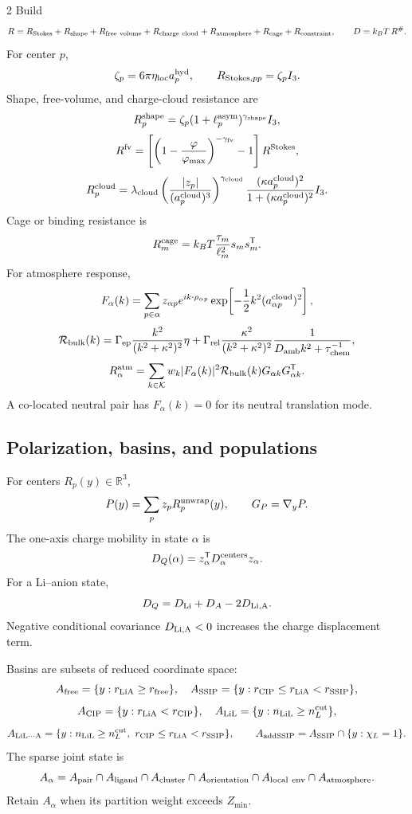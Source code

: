 \documentclass[10pt]{article}
\newcommand{\R}{\mathbb{R}}
\newcommand{\T}{\mathsf{T}}
\begin{document}
\begin{multicols}{2}
Build
\[
R=
R_{\rm Stokes}+R_{\rm shape}+R_{\rm free\ volume}
+R_{\rm charge\ cloud}+R_{\rm atmosphere}
+R_{\rm cage}+R_{\rm constraint},
\qquad
D=k_BT\,R^\#.
\]
For center \(p\),
\[
\zeta_p=6\pi\eta_{\rm loc}a_p^{\rm hyd},
\qquad
R_{{\rm Stokes},pp}=\zeta_p I_3.
\]
Shape, free-volume, and charge-cloud resistance are
\[
R_p^{\rm shape}
=
\zeta_p(1+\ell_p^{\rm asym})^{\gamma_{\rm shape}}I_3,
\]
\[
R^{\rm fv}
=
\left[
\left(1-\frac{\varphi}{\varphi_{\max}}\right)^{-\gamma_{\rm fv}}
-1
\right]R^{\rm Stokes},
\]
\[
R_p^{\rm cloud}
=
\lambda_{\rm cloud}
\left(\frac{|z_p|}{(a_p^{\rm cloud})^3}\right)^{\gamma_{\rm cloud}}
\frac{(\kappa a_p^{\rm cloud})^2}
{1+(\kappa a_p^{\rm cloud})^2}I_3.
\]
Cage or binding resistance is
\[
R_m^{\rm cage}
=
k_BT\frac{\tau_m}{\ell_m^2}s_ms_m^\T.
\]
For atmosphere response,
\[
F_\alpha(k)
=
\sum_{p\in\alpha}
z_{\alpha p}e^{ik\cdot\rho_{\alpha p}}
\exp\!\left[-\frac12k^2(a_{\alpha p}^{\rm cloud})^2\right],
\]
\[
\mathcal R_{\rm bulk}(k)
=
\Gamma_{\rm ep}\frac{k^2}{(k^2+\kappa^2)^2}\eta
+
\Gamma_{\rm rel}\frac{\kappa^2}{(k^2+\kappa^2)^2}
\frac{1}{D_{\rm amb}k^2+\tau_{\rm chem}^{-1}},
\]
\[
R_\alpha^{\rm atm}
=
\sum_{k\in\mathcal K}
w_k|F_\alpha(k)|^2\mathcal R_{\rm bulk}(k)
G_{\alpha k}G_{\alpha k}^\T.
\]
A co-located neutral pair has \(F_\alpha(k)=0\) for its neutral translation
mode.

\subsection{Polarization, basins, and populations}

For centers \(R_p(y)\in\R^3\),
\[
P(y)=\sum_p z_pR_p^{\rm unwrap}(y),
\qquad
G_P=\nabla_yP.
\]
The one-axis charge mobility in state \(\alpha\) is
\[
D_Q(\alpha)=z_\alpha^\T D_\alpha^{\rm centers}z_\alpha.
\]
For a Li--anion state,
\[
D_Q=D_{\rm Li}+D_A-2D_{\rm Li,A}.
\]
Negative conditional covariance \(D_{\rm Li,A}<0\) increases the charge
displacement term.

Basins are subsets of reduced coordinate space:
\[
A_{\rm free}=\{y:r_{\rm LiA}\ge r_{\rm free}\},
\quad
A_{\rm SSIP}=\{y:r_{\rm CIP}\le r_{\rm LiA}<r_{\rm SSIP}\},
\]
\[
A_{\rm CIP}=\{y:r_{\rm LiA}<r_{\rm CIP}\},
\quad
A_{\rm LiL}=\{y:n_{\rm LiL}\ge n_L^{\rm cut}\},
\]
\[
A_{\rm LiL\cdots A}
=
\{y:n_{\rm LiL}\ge n_L^{\rm cut},\
r_{\rm CIP}\le r_{\rm LiA}<r_{\rm SSIP}\},
\qquad
A_{\rm addSSIP}=A_{\rm SSIP}\cap\{y:\chi_L=1\}.
\]
The sparse joint state is
\[
A_\alpha=
A_{\rm pair}\cap A_{\rm ligand}\cap A_{\rm cluster}
\cap A_{\rm orientation}\cap A_{\rm local\ env}\cap A_{\rm atmosphere}.
\]
Retain \(A_\alpha\) when its partition weight exceeds \(Z_{\min}\).


\end{multicols}
\end{document}
